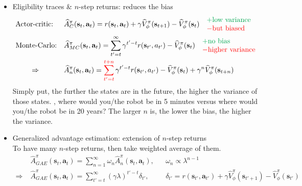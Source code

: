 \begin{itemize}
\begin{equation}
	\end{equation}	
	\item Eligibility traces \& $n$-step returns: reduces the bias \cite{mnih2016icml}
	\begin{align}
		&\text{Actor-critic:} &&\widehat{A}_C^\pi(\textbf{s}_t, \textbf{a}_t) = r(\textbf{s}_t, \textbf{a}_t) + \gamma \widehat{V}_\phi^\pi(\textbf{s}_{t+1}) - \widehat{V}_\phi^\pi(\textbf{s}_t) \quad \begin{matrix*}[l]
			{\color{Green} + \text{low variance}}\\
			{\color{red} - \text{but biased}}
		\end{matrix*}\\
		&\text{Monte-Carlo:} &&\widehat{A}_{MC}^\pi(\textbf{s}_t, \textbf{a}_t) = \sum_{t' = t}^\infty \gamma^{t'-t} r(\textbf{s}_{t'}, a_{t'}) - \widehat{V}_\phi^\pi(\textbf{s}_t) \quad\begin{matrix*}[l]
			{\color{Green} + \text{no bias}}\\
			{\color{red} - \text{higher variance}}				
		\end{matrix*}\\
		&\qquad\Rightarrow &&\widehat{A}_n^\pi (\textbf{s}_t, \textbf{a}_t) = \sum_{t'=t}^{\color{red} t+n} \gamma^{t'-t} r(\textbf{s}_{t'}, a_{t'}) - \widehat{V}_\phi^\pi(\textbf{s}_t) + \gamma^n \widehat{V}_\phi^\pi(\textbf{s}_{t+n})
	\end{align}
	Simply put, the further the states are in the future, the higher the variance of those states. \Eg, where would you/the robot be in 5 minutes versus where would you/the robot be in 20 years? The larger $n$ is, the lower the bias, the higher the variance.
	\item Generalized advantage estimation: extension of $n$-step returns \cite{schulman2015high}\\
	To have many $n$-step returns, then take weighted average of them.	
	\begin{align}
		&\widehat{A}_{GAE}^\pi(\textbf{s}_t, \textbf{a}_t) = \sum_{n=1}^\infty \omega_n \widehat{A}_n^\pi(\textbf{s}_t, \textbf{a}_t), && \omega_n \propto \lambda^{n-1}\\
		\Rightarrow\;&\widehat{A}_{GAE}^\pi(\textbf{s}_t, \textbf{a}_t) = \sum_{t'=t}^\infty (\gamma\lambda)^{t'-t} \delta_{t'}, && \delta_{t'} = r(\textbf{s}_{t'}, \textbf{a}_{t'}) + \gamma \widehat{V}^\pi_\phi(\textbf{s}_{t'+1}) - \widehat{V}_\phi^\pi(\textbf{s}_{t'})
	\end{align}
\end{itemize}

